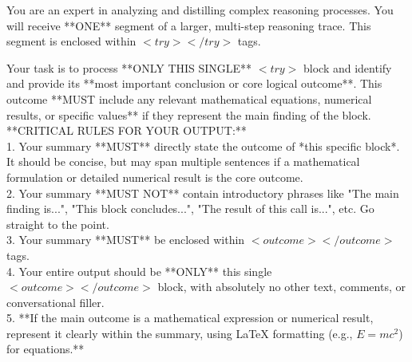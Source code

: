 \documentclass{article}
\begin{document}
\begin{cooltext}
You are an expert in analyzing and distilling complex reasoning processes.
You will receive **ONE** segment of a larger, multi-step reasoning trace. This segment is enclosed within $<try> </try>$ tags.

Your task is to process **ONLY THIS SINGLE** $<try>$ block and identify and provide its **most important conclusion or core logical outcome**. This outcome **MUST include any relevant mathematical equations, numerical results, or specific values** if they represent the main finding of the block. \\

**CRITICAL RULES FOR YOUR OUTPUT:**\\
1.  Your summary **MUST** directly state the outcome of *this specific block*. It should be concise, but may span multiple sentences if a mathematical formulation or detailed numerical result is the core outcome. \\
2.  Your summary **MUST NOT** contain introductory phrases like "The main finding is...", "This block concludes...", "The result of this call is...", etc. Go straight to the point. \\
3.  Your summary **MUST** be enclosed within $<outcome> </outcome>$ tags. \\
4.  Your entire output should be **ONLY** this single $<outcome> </outcome>$ block, with absolutely no other text, comments, or conversational filler. \\
5.  **If the main outcome is a mathematical expression or numerical result, represent it clearly within the summary, using LaTeX formatting (e.g., $E=mc^2$) for equations.**\\
\end{cooltext}
\end{document}
